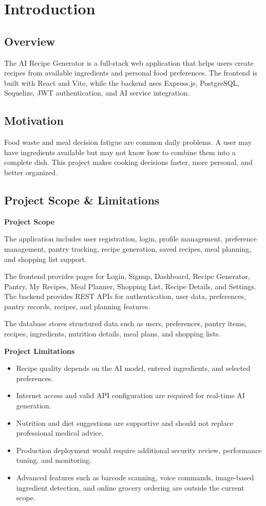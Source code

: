 \section{Introduction}

\subsection{Overview}
The AI Recipe Generator is a full-stack web application that helps users create recipes from available ingredients and personal food preferences. The frontend is built with React and Vite, while the backend uses Express.js, PostgreSQL, Sequelize, JWT authentication, and AI service integration.

\subsection{Motivation}
Food waste and meal decision fatigue are common daily problems. A user may have ingredients available but may not know how to combine them into a complete dish. This project makes cooking decisions faster, more personal, and better organized.

\subsection{Project Scope \& Limitations}
\textbf{Project Scope}

The application includes user registration, login, profile management, preference management, pantry tracking, recipe generation, saved recipes, meal planning, and shopping list support.

The frontend provides pages for Login, Signup, Dashboard, Recipe Generator, Pantry, My Recipes, Meal Planner, Shopping List, Recipe Details, and Settings. The backend provides REST APIs for authentication, user data, preferences, pantry records, recipes, and planning features.

The database stores structured data such as users, preferences, pantry items, recipes, ingredients, nutrition details, meal plans, and shopping lists.

\textbf{Project Limitations}
\begin{itemize}
\item Recipe quality depends on the AI model, entered ingredients, and selected preferences.
\item Internet access and valid API configuration are required for real-time AI generation.
\item Nutrition and diet suggestions are supportive and should not replace professional medical advice.
\item Production deployment would require additional security review, performance tuning, and monitoring.
\item Advanced features such as barcode scanning, voice commands, image-based ingredient detection, and online grocery ordering are outside the current scope.
\end{itemize}

